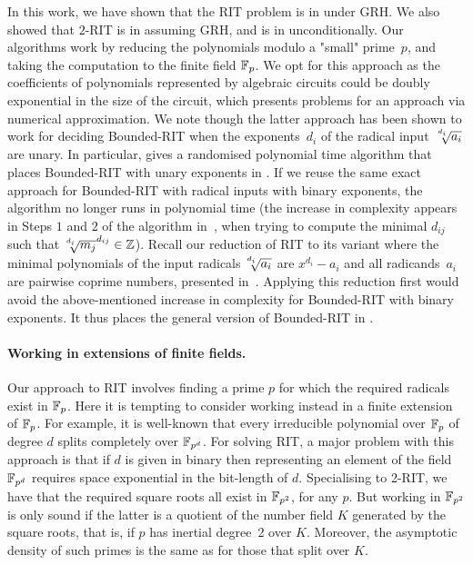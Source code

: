 
In this work, we have shown that the RIT problem is in {\coNP} under GRH. We also showed that $2$-RIT is in {\coRP} assuming GRH, and is in {\coNP} unconditionally. Our algorithms  work by reducing the polynomials modulo a "small" prime~$p$, and taking the computation to the finite field $\mathbb{F}_p$. We opt for this approach as the coefficients of polynomials represented by algebraic circuits could be doubly exponential in the size of the circuit, which presents problems for an approach via
numerical approximation. We note though the latter approach has been shown to work for deciding  Bounded-RIT  when the exponents~$d_i$ of the radical input~$\mysqrt{d_i}{a_i}$ are unary. In particular, \cite{blomer98} gives a randomised polynomial time algorithm that places  Bounded-RIT  with unary exponents in {\coRP}. 
If we reuse the same exact approach for  Bounded-RIT  with radical inputs with binary exponents, the algorithm no longer runs in polynomial time (the increase in complexity appears in Steps $1$ and $2$ of the algorithm in~\cite{blomer98}, when trying to compute the minimal $d_{ij}$ such that $\mysqrt{d_i}{m_j}^{d_{ij}}\in\ZZ$). Recall our reduction of RIT to its variant where the minimal polynomials of the input radicals $\mysqrt{d_i}{a_i}$ are $x^{d_i}-a_i$ and   all radicands~$a_i$ are pairwise coprime numbers, presented in~. Applying this reduction first would 
avoid the above-mentioned increase in complexity for  Bounded-RIT  with binary exponents.
It thus places the general version of  Bounded-RIT  in 
{\coRP}. 


\paragraph{\bf Working in extensions of finite fields.}
Our approach to RIT involves
finding a prime $p$ for which the required radicals 
exist in $\mathbb{F}_p$.  Here it is tempting to consider working instead in a finite extension of $\mathbb{F}_p$.  For example, it is well-known that every irreducible polynomial over $\mathbb{F}_p$ of degree $d$ splits completely over $\mathbb{F}_{p^d}$.
For solving RIT, a major problem with this approach is that if $d$ is given in binary then representing an element of the field $\mathbb{F}_{p^d}$ requires space
exponential in the bit-length of $d$.  Specialising to 2-RIT, we have that the 
required square roots all exist in $\mathbb{F}_{p^2}$, for any $p$.  But working in $\mathbb{F}_{p^2}$ is only sound if the latter is a quotient of the number field $K$ generated by the square roots, that is, if $p$ has inertial degree~2 over $K$.  Moreover, the asymptotic density of such primes is the same as for those that split over $K$.  
